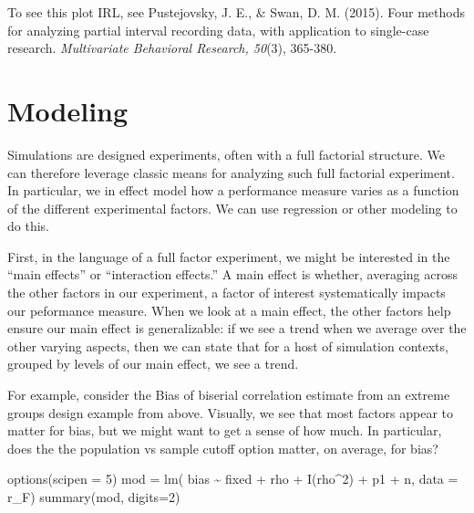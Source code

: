 \documentclass[
]{book}
\newenvironment{Shaded}{\begin{snugshade}}{\end{snugshade}}
\newcommand{\AttributeTok}[1]{\textcolor[rgb]{0.77,0.63,0.00}{#1}}
\newcommand{\DecValTok}[1]{\textcolor[rgb]{0.00,0.00,0.81}{#1}}
\newcommand{\FunctionTok}[1]{\textcolor[rgb]{0.00,0.00,0.00}{#1}}
\newcommand{\NormalTok}[1]{#1}
\newcommand{\OtherTok}[1]{\textcolor[rgb]{0.56,0.35,0.01}{#1}}
\newcommand{\SpecialCharTok}[1]{\textcolor[rgb]{0.00,0.00,0.00}{#1}}
\begin{document}
To see this plot IRL, see Pustejovsky, J. E., \& Swan, D. M. (2015). Four methods for analyzing partial interval recording data, with application to single-case research. \emph{Multivariate Behavioral Research, 50}(3), 365-380.

\hypertarget{modeling}{%
\section{Modeling}\label{modeling}}

Simulations are designed experiments, often with a full factorial structure.
We can therefore leverage classic means for analyzing such full factorial experiment.
In particular, we in effect model how a performance measure varies as a function of the different experimental factors.
We can use regression or other modeling to do this.

First, in the language of a full factor experiment, we might be interested in the ``main effects'' or ``interaction effects.''
A main effect is whether, averaging across the other factors in our experiment, a factor of interest systematically impacts our peformance measure.
When we look at a main effect, the other factors help ensure our main effect is generalizable: if we see a trend when we average over the other varying aspects, then we can state that for a host of simulation contexts, grouped by levels of our main effect, we see a trend.

For example, consider the Bias of biserial correlation estimate from an extreme groups design example from above.
Visually, we see that most factors appear to matter for bias, but we might want to get a sense of how much.
In particular, does the the population vs sample cutoff option matter, on average, for bias?

\begin{Shaded}
\begin{Highlighting}[]
\FunctionTok{options}\NormalTok{(}\AttributeTok{scipen =} \DecValTok{5}\NormalTok{)}
\NormalTok{mod }\OtherTok{=} \FunctionTok{lm}\NormalTok{( bias }\SpecialCharTok{\textasciitilde{}}\NormalTok{ fixed }\SpecialCharTok{+}\NormalTok{ rho }\SpecialCharTok{+} \FunctionTok{I}\NormalTok{(rho}\SpecialCharTok{\^{}}\DecValTok{2}\NormalTok{) }\SpecialCharTok{+}\NormalTok{ p1 }\SpecialCharTok{+}\NormalTok{ n, }\AttributeTok{data =}\NormalTok{ r\_F)}
\FunctionTok{summary}\NormalTok{(mod, }\AttributeTok{digits=}\DecValTok{2}\NormalTok{)}
\end{Highlighting}
\end{Shaded}
\end{document}
